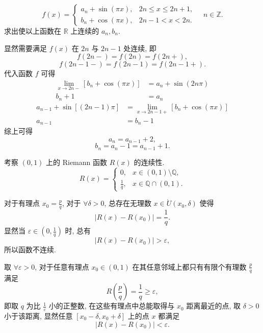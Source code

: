 \documentclass[cn,toc=twocol]{elegantbook}
\newcommand{\R}{\mathbb{R}}
\newcommand{\Z}{\mathbb{Z}}
\newcommand{\Q}{\mathbb{Q}}
\begin{document}
\begin{example}
\[
f(x) = \begin{cases}
	a_n + \sin (\pi x), & 2n \le x \le 2n + 1,\\
	b_n + \cos (\pi x), & 2n - 1 < x < 2n.
\end{cases}\quad n \in \Z.
\]
求出使以上函数在 $\R$ 上连续的 $a_n, b_n$.
\end{example}
\begin{solution}
显然需要满足 $f(x)$ 在 $2n$ 与 $2n - 1$ 处连续, 即
\[
	f(2n-) = f(2n) = f(2n+),
\]
\[
	f(2n-1 -) = f(2n-1) = f(2n-1 +).
\]
代入函数 $f$ 可得
\[
\begin{aligned}
	\lim_{x \to 2n-} [b_n + \cos (\pi x)] &= a_n + \sin (2n\pi)\\
	b_n + 1 &= a_n
\end{aligned}
\]
\[
\begin{aligned}
	a_{n-1} + \sin [(2n - 1)\pi] &= \lim_{x \to 2n-1+} [b_n + \cos (\pi x)]\\
	a_{n-1} &= b_n - 1
\end{aligned}
\]
综上可得
\[
	a_n = a_{n-1} + 2,
\]
\[
	b_n = a_n - 1 = a_{n-1} + 1.
\]
\end{solution}

\vspace{0.5em}

\begin{example}
考察 $(0,1)$ 上的 Riemann 函数 $R(x)$ 的连续性.
\[
R(x) = \begin{cases}
	0, &x \in (0,1)\setminus\Q,\\
	\frac{1}{q}, &x \in \Q \cap (0,1).
\end{cases}
\]
\end{example}
\begin{solution}
对于有理点 $x_0 = \frac{p}{q}$, 对于 $\forall \delta > 0$, 总存在无理数 $x \in \mathring{U}(x_0,\delta)$ 使得 
\[
	\lvert R(x) - R(x_0)\rvert = \frac{1}{q}.
\]
显然当 $\varepsilon \in (0,\frac{1}{q})$ 时, 总有
\[
	\lvert R(x) - R(x_0)\rvert>\varepsilon,
\]
所以函数不连续.
\smallskip


取 $\forall \varepsilon > 0$, 对于任意有理点 $x_0\in(0,1)$ 在其任意邻域上都只有有限个有理数 $\frac{p}{q}$ 满足 
\[
	R(\frac{p}{q}) = \frac{1}{q} \ge \varepsilon,
\]
即取 $q$ 为比 $\frac{1}{\varepsilon}$ 小的正整数, 在这些有理点中总能取得与 $x_0$ 距离最近的点, 取 $\delta > 0$ 小于该距离, 显然任意 $[x_0-\delta,x_0+\delta]$ 上的点 $x$ 都满足 
\[
	\lvert R(x) - R(x_0) \rvert < \varepsilon.
\]
\end{solution}
\end{document}
